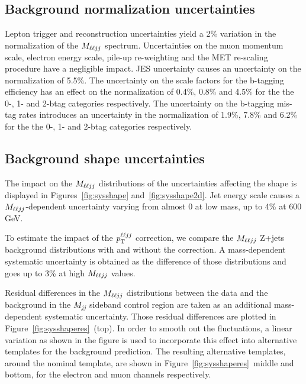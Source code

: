 \subsection{Background normalization uncertainties}

Lepton trigger and reconstruction uncertainties yield a 2\% variation in the
normalization of the $M_{\ell\ell jj}$ spectrum. Uncertainties on the muon momentum scale,
electron energy scale, pile-up re-weighting and the MET re-scaling procedure have a negligible impact. JES uncertainty 
causes an uncertainty on the normalization of 5.5\%. The uncertainty on the scale factors for the b-tagging efficiency has an effect on the normalization of 0.4\%, 0.8\% and 4.5\% for the the 0-, 1- and 2-btag categories respectively. The uncertainty on the b-tagging mis-tag rates introduces an uncertainty in the normalization of 1.9\%, 7.8\% and 6.2\% for the the 0-, 1- and 2-btag categories respectively.






\subsection{Background shape uncertainties}

The impact on the $M_{\ell\ell jj}$ distributions of the uncertainties affecting the shape is displayed in Figures~\ref{fig:sysshape} and~\ref{fig:sysshape2d}. Jet energy scale causes a $M_{\ell\ell jj}$-dependent uncertainty varying from almost 0 at low mass, up to 4\% at 600 GeV.

To estimate the impact of the $p_{\mathrm{T}}^{\ell\ell jj}$ correction, we compare the $M_{\ell\ell jj}$ Z+jets background distributions with and without the correction. A mass-dependent systematic uncertainty is obtained as the difference of those distributions and goes up to 3\% at high $M_{\ell\ell jj}$ values.

Residual differences in the $M_{\ell\ell jj}$ distributions between the data and the background in the $M_{jj}$ sideband control region are taken as an additional mass-dependent systematic uncertainty. Those residual differences are plotted in Figure~\ref{fig:sysshaperes}~(top). In order to smooth out the fluctuations, a linear variation as shown in the figure is used to incorporate this effect into alternative templates for the background prediction. The resulting alternative templates, around the nominal template, are shown in Figure~\ref{fig:sysshaperes}~middle and bottom, for the electron and muon channels respectively. 



